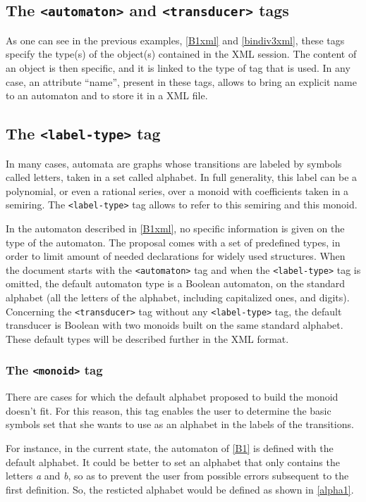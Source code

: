\documentclass[a4paper]{article}
\newcommand{\xtag}[1]{\texttt{<#1>}}
\def\typetag{\xtag{label-type}}
\def\automatontag{\xtag{automaton}}
\def\transducertag{\xtag{transducer}}
\def\monoidtag{\xtag{monoid}}
\begin{document}
\subsection{The \automatontag{} and \transducertag{} tags}

As one can see in the previous examples, \autoref{B1xml} and
\autoref{bindiv3xml}, these tags specify the type(s) of the object(s)
contained in the XML session. The content of an object is then
specific, and it is linked to the type of tag that is used.  In any
case, an attribute ``name'', present in these tags, allows to bring an
explicit name to an automaton and to store it in a XML file.

\subsection{The \typetag{} tag}

In many cases, automata are graphs whose transitions are labeled by
symbols called letters, taken in a set called alphabet. In full
generality, this label can be a polynomial, or even a rational series,
over a monoid with coefficients taken in a semiring. The \typetag{}
tag allows to refer to this semiring and this monoid.

In the automaton described in \autoref{B1xml}, no specific information
is given on the type of the automaton. The proposal comes with a set
of predefined types, in order to limit amount of needed declarations
for widely used structures. When the document starts with the
\automatontag{} tag and when the \typetag{} tag is omitted, the
default automaton type is a Boolean automaton, on the standard
alphabet (all the letters of the alphabet, including capitalized ones,
and digits).  Concerning the \transducertag{} tag without any
\typetag{} tag, the default transducer is Boolean with two monoids
built on the same standard alphabet.  These default types will be
described further in the XML format.


\subsubsection{The \monoidtag{} tag}

There are cases for which the default alphabet proposed to build the
monoid doesn't fit. For this reason, this tag enables the user to
determine the basic symbols set that she wants to use as an alphabet
in the labels of the transitions.

For instance, in the current state, the automaton of \autoref{B1} is
defined with the default alphabet. It could be better to set an
alphabet that only contains the letters \textit{a} and \textit{b}, so
as to prevent the user from possible errors subsequent to the first
definition. So, the resticted alphabet would be defined as shown in
\autoref{alpha1}.
\end{document}
